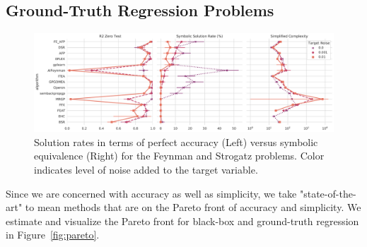\subsection{Ground-Truth Regression Problems}

\begin{figure}
    \centering
    \includegraphics[width=\textwidth]{figs/results_sym_data/pairgrid_r2_zero_test_symbolic_solution_rate_(pct)_simplified_complexity.pdf}
    \caption{
        Solution rates in terms of perfect accuracy (Left) versus symbolic equivalence (Right) for the Feynman and Strogatz problems. 
        Color indicates level of noise added to the target variable. 
    }
    \label{fig:symbolic_solns}
\end{figure}

Since we are concerned with accuracy as well as simplicity, we take "state-of-the-art" to mean methods that are on the Pareto front of accuracy and simplicity. 
We estimate and visualize the Pareto front for black-box and ground-truth regression in Figure~\ref{fig:pareto}. 

